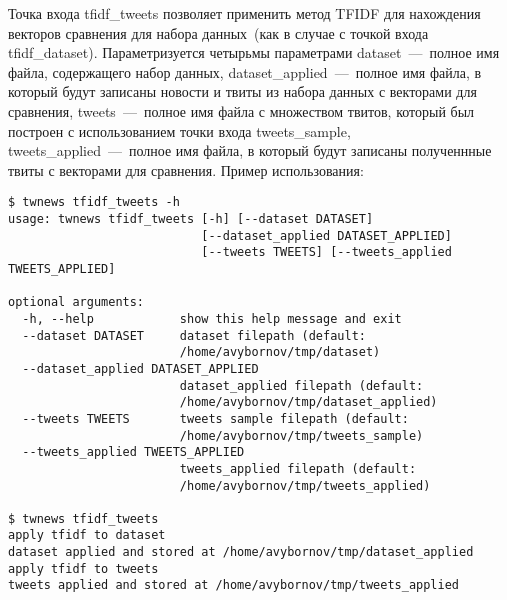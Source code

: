 
        Точка входа tfidf\_tweets позволяет применить метод TFIDF для нахождения векторов сравнения для набора данных~(как в случае с точкой входа tfidf\_dataset).
        Параметризуется четырьмы параметрами
        dataset~---~полное имя файла, содержащего набор данных,
        dataset\_applied~---~полное имя файла, в который будут записаны новости и твиты из набора данных с векторами для сравнения,
        tweets~---~полное имя файла с множеством твитов, который был построен с использованием точки входа tweets\_sample,
        tweets\_applied~---~полное имя файла, в который будут записаны полученнные твиты с векторами для сравнения.
        Пример использования:
        \begin{lstlisting}
$ twnews tfidf_tweets -h
usage: twnews tfidf_tweets [-h] [--dataset DATASET]
                           [--dataset_applied DATASET_APPLIED]
                           [--tweets TWEETS] [--tweets_applied TWEETS_APPLIED]

optional arguments:
  -h, --help            show this help message and exit
  --dataset DATASET     dataset filepath (default:
                        /home/avybornov/tmp/dataset)
  --dataset_applied DATASET_APPLIED
                        dataset_applied filepath (default:
                        /home/avybornov/tmp/dataset_applied)
  --tweets TWEETS       tweets sample filepath (default:
                        /home/avybornov/tmp/tweets_sample)
  --tweets_applied TWEETS_APPLIED
                        tweets_applied filepath (default:
                        /home/avybornov/tmp/tweets_applied)

$ twnews tfidf_tweets
apply tfidf to dataset
dataset applied and stored at /home/avybornov/tmp/dataset_applied
apply tfidf to tweets
tweets applied and stored at /home/avybornov/tmp/tweets_applied
        \end{lstlisting}



